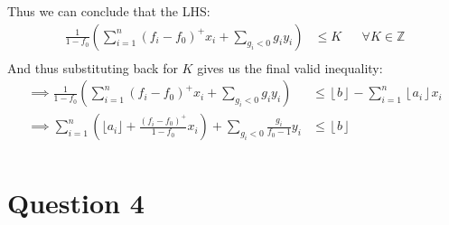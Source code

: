 \documentclass{article}
\begin{document}
Thus we can conclude that the LHS:
\begin{align*}
    \frac{1}{1-f_0} \left( \sum_{i=1}^{n} \left(f_i-f_0\right)^+ x_i + \sum_{g_i < 0} g_i y_i \right) &\leq K &&\text{$\forall K\in \mathbb{Z}$}\\
\end{align*}
And thus substituting back for $K$ gives us the final valid inequality:
\begin{align*}
    \implies \frac{1}{1-f_0} \left( \sum_{i=1}^{n} \left(f_i-f_0\right)^+ x_i + \sum_{g_i < 0} g_i y_i \right) &\leq \left\lfloor b \right\rfloor - \sum_{i=1}^{n} \left\lfloor a_i \right\rfloor x_i\\
    \implies \sum_{i=1}^{n}\left( \lfloor a_i \rfloor  + \frac{\left(f_i-f_0\right)^+}{1-f_0} x_i \right) + \sum_{g_i < 0} \frac{g_i}{f_0-1} y_i &\leq \left\lfloor b \right\rfloor\\
\end{align*}

\section*{Question 4}
\end{document}
